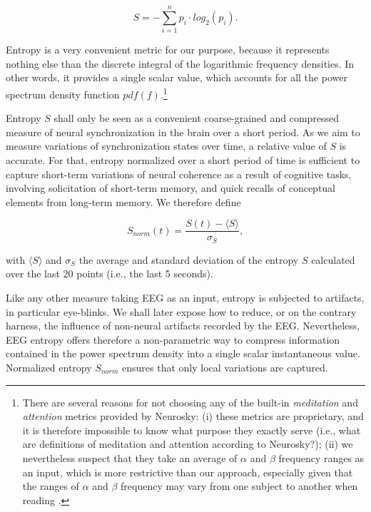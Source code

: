 
\begin{equation}
\label{eq:shannon}
S = - \sum_{i=1}^n p_i\cdot log_{2}(p_i).
\end{equation}

Entropy is a very convenient metric for our purpose, because it represents nothing else than the discrete integral of the logarithmic frequency densities. In other words, it provides a single scalar value, which accounts for all the power spectrum density function $pdf(f)$.\footnote{There are several reasons for not choosing any of the built-in {\it meditation} and {\it attention} metrics provided by Neurosky: (i) these metrics are proprietary, and it is therefore impossible to know what purpose they exactly serve (i.e., what are definitions of meditation and attention according to Neurosky?); (ii) we nevertheless suspect that they take an average of $\alpha$ and $\beta$ frequency ranges as an input, which is more restrictive than our approach, especially given that the ranges of $\alpha$ and $\beta$ frequency may vary from one subject to another when reading \cite{}.} 

Entropy $S$ shall only be seen as a convenient coarse-grained and compressed measure of neural synchronization in the brain over a short period. As we aim to measure variations of synchronization states over time, a relative value of $S$ is accurate. For that, entropy normalized over a short period of time is sufficient to capture short-term variations of neural coherence as a result of cognitive tasks, involving solicitation of short-term memory, and quick recalls of conceptual elements from long-term memory. We therefore define 

\begin{equation}
\label{eq:Snormalized}
S_{norm}(t) = \frac{S(t) - \langle S \rangle}{\sigma_{S}}, 
\end{equation}

with $\langle S \rangle$ and $\sigma_{S}$ the average and standard deviation of the entropy $S$ calculated over the last 20 points (i.e., the last 5 seconds). %

Like any other measure taking EEG as an input, entropy is subjected to artifacts, in particular eye-blinks. We shall later expose how to reduce, or on the contrary harness, the influence of non-neural artifacts recorded by the EEG. Nevertheless, EEG entropy offers therefore a non-parametric way to compress information contained in the power spectrum density into a single scalar instantaneous value. Normalized entropy $S_{norm}$ ensures that only local variations are captured. 


